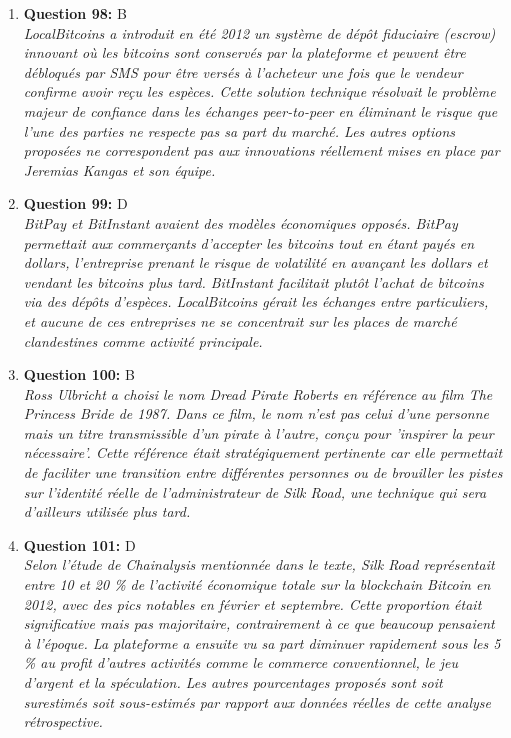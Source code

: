 \documentclass[12pt,a4paper]{article}
\begin{document}
\begin{enumerate}
\item \textbf{Question 98:} B
\\ \textit{LocalBitcoins a introduit en été 2012 un système de dépôt fiduciaire (escrow) innovant où les bitcoins sont conservés par la plateforme et peuvent être débloqués par SMS pour être versés à l'acheteur une fois que le vendeur confirme avoir reçu les espèces. Cette solution technique résolvait le problème majeur de confiance dans les échanges peer-to-peer en éliminant le risque que l'une des parties ne respecte pas sa part du marché. Les autres options proposées ne correspondent pas aux innovations réellement mises en place par Jeremias Kangas et son équipe.}

\item \textbf{Question 99:} D
\\ \textit{BitPay et BitInstant avaient des modèles économiques opposés. BitPay permettait aux commerçants d'accepter les bitcoins tout en étant payés en dollars, l'entreprise prenant le risque de volatilité en avançant les dollars et vendant les bitcoins plus tard. BitInstant facilitait plutôt l'achat de bitcoins via des dépôts d'espèces. LocalBitcoins gérait les échanges entre particuliers, et aucune de ces entreprises ne se concentrait sur les places de marché clandestines comme activité principale.}

\item \textbf{Question 100:} B
\\ \textit{Ross Ulbricht a choisi le nom Dread Pirate Roberts en référence au film The Princess Bride de 1987. Dans ce film, le nom n'est pas celui d'une personne mais un titre transmissible d'un pirate à l'autre, conçu pour 'inspirer la peur nécessaire'. Cette référence était stratégiquement pertinente car elle permettait de faciliter une transition entre différentes personnes ou de brouiller les pistes sur l'identité réelle de l'administrateur de Silk Road, une technique qui sera d'ailleurs utilisée plus tard.}

\item \textbf{Question 101:} D
\\ \textit{Selon l'étude de Chainalysis mentionnée dans le texte, Silk Road représentait entre 10 et 20 \% de l'activité économique totale sur la blockchain Bitcoin en 2012, avec des pics notables en février et septembre. Cette proportion était significative mais pas majoritaire, contrairement à ce que beaucoup pensaient à l'époque. La plateforme a ensuite vu sa part diminuer rapidement sous les 5 \% au profit d'autres activités comme le commerce conventionnel, le jeu d'argent et la spéculation. Les autres pourcentages proposés sont soit surestimés soit sous-estimés par rapport aux données réelles de cette analyse rétrospective.}


\end{enumerate}
\end{document}
